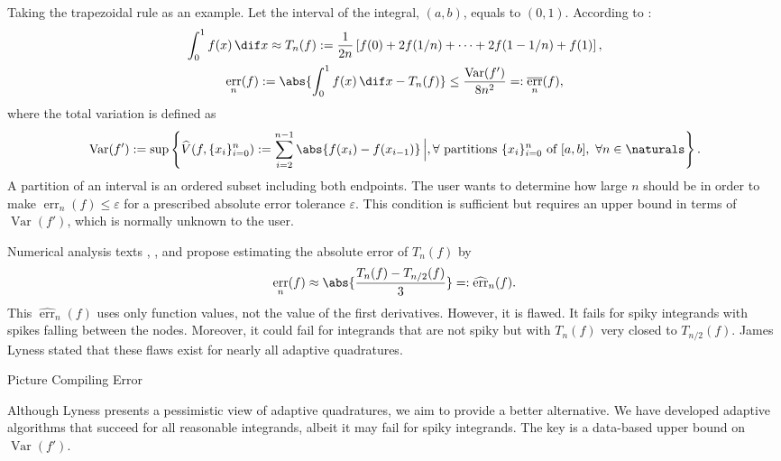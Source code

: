 \documentclass[]{elsarticle}
\DeclareMathOperator{\Var}{Var}
\DeclareMathOperator{\err}{err}
\newcommand{\herr}{\widehat{\err}}
\theoremstyle{definition}
\theoremstyle{remark}
\DeclareMathOperator{\oerr}{\overline{\err}}
\begin{document}
Taking the trapezoidal rule as an example. Let the interval of the integral, $(a,b)$, equals to $(0,1)$. According to \cite[Sect.\ 7.2, (7.15)]{BraPet11a}:
\begin{gather}
\label{traprule}
\int_0^1 f(x) \, \dif x \approx T_n(f):= \frac1{2n} \left[f(0) + 2f(1/n) + \cdots + 2f(1-1/n) + f(1) \right ], \\
\label{traperrbd}
\err_n(f) := \abs{\int_0^1 f(x) \, \dif x - T_n(f)}  \le \frac{\Var(f')}{8 n^2} =: \oerr_n(f),
\end{gather}
where the total variation is defined as
\begin{equation*}
\Var(f') : = \sup \left \{\widehat{V}(f,\{x_i\}_{i=0}^n) := \sum_{i=2}^{n-1}  \abs{f(x_i) - f(x_{i-1})} \, \Big \vert, \\
\forall \text{ partitions }  \{x_i\}_{i=0}^n \text{ of } [a,b], \ \forall n \in \naturals \right \}.
\end{equation*}
A partition of an interval is an ordered subset including both endpoints. The user wants to determine how large $n$ should be in order to make  $\err_n(f)  \le \varepsilon$ for a prescribed
absolute error tolerance $\varepsilon$. This condition is sufficient but requires an upper bound in terms of $\Var(f')$, which is normally unknown to the user.

Numerical analysis texts  \cite[p.\ 223--224]{BurFai10}, \cite[p.\ 233]{CheKin12a},
and  \cite[p.\ 270]{Sau12a} propose estimating the absolute error of $T_n(f)$ by
\begin{equation} \label{tradtraperrest}
 \err_n(f) \approx  \abs{\frac{T_n(f) - T_{n/2}(f)}{3}} =: \herr_n(f).
\end{equation}
This $\herr_n(f)$ uses only function values, not the value of the first derivatives. However, it is flawed. It fails for spiky integrands with spikes falling between the nodes. Moreover, it could fail for integrands that are not spiky but with $T_n(f)$ very closed to $T_{n/2}(f)$. James Lyness \cite[p.\ 69]{Lyn83} stated that these flaws exist for nearly all adaptive quadratures.

Picture Compiling Error

Although Lyness presents a pessimistic view of adaptive quadratures, we aim to provide a better alternative. We have developed adaptive algorithms that succeed for all reasonable integrands, albeit it may fail for spiky integrands\cite{HicEtal14a}. The key is a data-based upper bound on $\Var(f')$.
\end{document}
